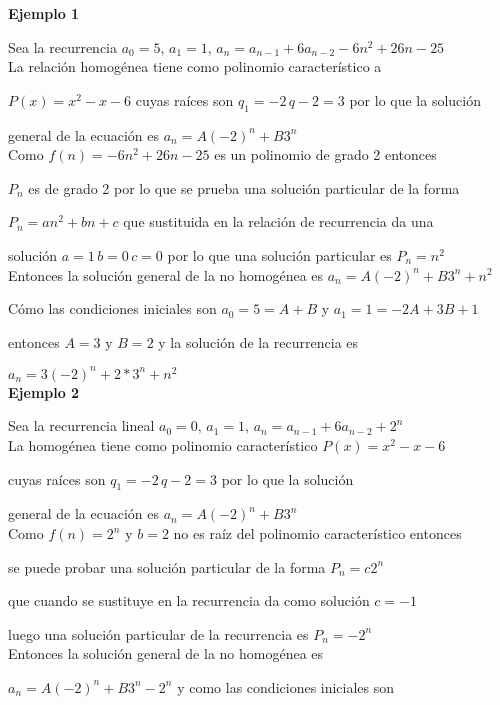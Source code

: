 \documentclass[a4paper,12pt]{report}
\begin{document}
\textbf{Ejemplo 1}

Sea la recurrencia $a_0=5,\, a_1=1,\, a_n=a_{n-1}+6a_{n-2}-6n^2+26n-25$\\

La relación homogénea tiene como polinomio característico a

$P(x)=x^2-x-6$  cuyas raíces son $q_1=-2\, q-2=3$ por lo que la solución 

general de la ecuación es  $a_n=A(-2)^n+B3^n$\\

Como $f(n)=-6n^2+26n-25$ es un polinomio de grado 2 entonces 

$P_n$ es de grado 2 por lo que se prueba una solución particular de la forma 

$P_n=an^2+bn+c$ que sustituida en la relación de recurrencia da una 

solución $a=1\, b=0\, c=0$ por lo que una solución particular es $P_n=n^2$\\

Entonces la solución general de la no homogénea es $a_n=A(-2)^n+B3^n+n^2$

Cómo las condiciones iniciales son $a_0=5=A+B$ y $a_1=1=-2A+3B+1$ 

entonces $A=3$ y $B=2$ y la solución de la recurrencia es 

$a_n=3(-2)^n+2*3^n+n^2$\\

\textbf{Ejemplo 2}

Sea la recurrencia lineal $a_0=0,\, a_1=1,\, a_n=a_{n-1}+6a_{n-2}+2^n$\\

La homogénea tiene como polinomio característico $P(x)=x^2-x-6$ 

cuyas raíces son $q_1=-2\, q-2=3$ por lo que la solución 

general de la ecuación es  $a_n=A(-2)^n+B3^n$\\

Como $f(n)=2^n$ y  $b=2$ no es raíz del polinomio característico entonces 

se puede probar una solución particular de la forma $P_n=c2^n$

que cuando se sustituye en la recurrencia da como solución $c=-1$

luego una solución particular de la recurrencia es $P_n=-2^n$\\

Entonces la solución general de la no homogénea es 

$a_n=A(-2)^n+B3^n-2^n$ y como las condiciones iniciales son 
\end{document}

